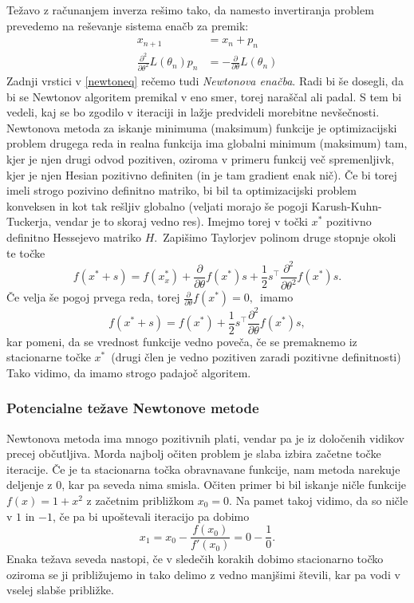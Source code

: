 \documentclass[12pt,a4paper]{amsart}
\theoremstyle{definition} %
\theoremstyle{plain} %
\begin{document}
Težavo z računanjem inverza rešimo tako, da namesto invertiranja problem prevedemo na reševanje sistema enačb za premik:
\begin{align}\label{newtoneq}
    x_{n + 1} &= x_{n} + p_{n} \nonumber\\
    \frac{\partial^2}{\partial\theta^2}L(\theta_{n})p_{n} &= -\frac{\partial}{\partial\theta} L(\theta_{n})
\end{align}
Zadnji vrstici v \eqref{newtoneq} rečemo tudi \textit{Newtonova enačba}.
Radi bi še dosegli, da bi se Newtonov algoritem premikal v eno smer, torej naraščal ali padal. S tem bi vedeli, kaj se bo zgodilo v iteraciji in lažje predvideli morebitne
nevšečnosti. Newtonova metoda za iskanje minimuma (maksimum) funkcije je optimizacijski problem drugega reda in realna funkcija ima globalni minimum (maksimum) tam, kjer je
njen drugi odvod pozitiven, oziroma v primeru funkcij več spremenljivk, kjer je njen Hesian pozitivno definiten (in je tam gradient enak nič). Če bi torej imeli
strogo pozivino definitno matriko, bi bil ta optimizacijski problem konveksen in kot tak rešljiv globalno (veljati morajo še pogoji Karush-Kuhn-Tuckerja, vendar je to skoraj vedno res).
Imejmo torej v točki $x^{*}$ pozitivno definitno Hessejevo matriko $H.$~Zapišimo Taylorjev polinom druge stopnje okoli te točke
\[
    f(x^{*} + s) = f(x_x^{*}) + \frac{\partial}{\partial\theta} f(x^{*})s + \frac{1}{2}s^\top \frac{\partial^2}{\partial\theta^2}f(x^{*})s.
\]
Če velja še pogoj prvega reda, torej $\frac{\partial}{\partial\theta} f(x^{*}) = 0,$~imamo
\[
    f(x^{*} + s) = f(x^{*}) + \frac{1}{2}s^\top \frac{\partial^2}{\partial\theta}f(x^{*})s,
\]
kar pomeni, da se vrednost funkcije vedno poveča, če se premaknemo iz stacionarne točke $x^{*}$~(drugi člen je vedno pozitiven zaradi pozitivne definitnosti)
Tako vidimo, da imamo strogo padajoč algoritem.

\subsubsection{Potencialne težave Newtonove metode}
Newtonova metoda ima mnogo pozitivnih plati, vendar pa je iz določenih vidikov precej občutljiva. Morda najbolj očiten problem je slaba izbira začetne točke iteracije. Če je ta
stacionarna točka obravnavane funkcije, nam metoda narekuje deljenje z 0, kar pa seveda nima smisla. Očiten primer bi bil iskanje ničle funkcije $f(x) = 1+x^2$ z začetnim približkom $x_{0} = 0.$
Na pamet takoj vidimo, da so ničle v $1$ in $-1$, če pa bi upoštevali iteracijo pa dobimo
\[
    x_{1} = x_{0} - \frac{f(x_{0})}{f'(x_{0})} = 0 - \frac{1}{0}.   
\]
Enaka težava seveda nastopi, če v sledečih korakih dobimo stacionarno točko oziroma se ji približujemo in tako delimo z vedno manjšimi števili, kar pa vodi v vselej slabše približke.
\end{document}
